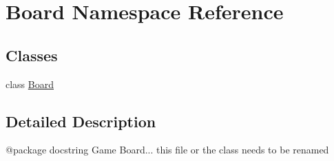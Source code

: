 \hypertarget{namespace_board}{}\section{Board Namespace Reference}
\label{namespace_board}
\subsection*{Classes}
\begin{DoxyCompactItemize}
\item 
class \hyperlink{class_board_1_1_board}{Board}
\end{DoxyCompactItemize}


\subsection{Detailed Description}
\begin{DoxyVerb}@package docstring
   Game Board... this file or the class needs to be renamed
\end{DoxyVerb}
 